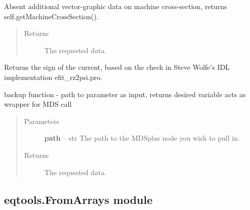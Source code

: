 \documentclass[letterpaper,10pt,english]{sphinxmanual}
\begin{document}
\begin{fulllineitems}
\begin{fulllineitems}
Absent additional vector-graphic data on machine cross-section, returns
self.getMachineCrossSection().
\begin{quote}\begin{description}
\item[{Returns}] \leavevmode
The requested data.

\end{description}\end{quote}

\end{fulllineitems}


\begin{fulllineitems}
\label{eqtools:eqtools.EFIT.EFITTree.getCurrentSign}
Returns the sign of the current, based on the check in Steve Wolfe's IDL implementation efit\_rz2psi.pro.

\end{fulllineitems}


\begin{fulllineitems}
\label{eqtools:eqtools.EFIT.EFITTree.getParam}
backup function - path to parameter as input, returns desired variable acts as wrapper for MDS call
\begin{quote}\begin{description}
\item[{Parameters}] \leavevmode
\textbf{path} -- str
The path to the MDSplus node you wish to pull in.

\item[{Returns}] \leavevmode
The requested data.

\end{description}\end{quote}

\end{fulllineitems}


\end{fulllineitems}



\subsection{eqtools.FromArrays module}
\label{eqtools:module-eqtools.FromArrays}\label{eqtools:eqtools-fromarrays-module}
\end{document}

